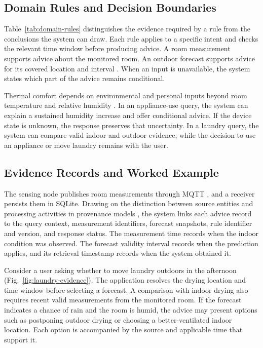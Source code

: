 

\subsection{Domain Rules and Decision Boundaries}
Table~\ref{tab:domain-rules} distinguishes the evidence required by a rule from the conclusions the system can draw. Each rule applies to a specific intent and checks the relevant time window before producing advice. A room measurement supports advice about the monitored room. An outdoor forecast supports advice for its covered location and interval \cite{cwa_open_data}. When an input is unavailable, the system states which part of the advice remains conditional.



Thermal comfort depends on environmental and personal inputs beyond room temperature and relative humidity \cite{tartarini2020cbe}. In an appliance-use query, the system can explain a sustained humidity increase and offer conditional advice. If the device state is unknown, the response preserves that uncertainty. In a laundry query, the system can compare valid indoor and outdoor evidence, while the decision to use an appliance or move laundry remains with the user.

\subsection{Evidence Records and Worked Example}
The sensing node publishes room measurements through MQTT \cite{oasis2019mqtt}, and a receiver persists them in SQLite. Drawing on the distinction between source entities and processing activities in provenance models \cite{w3c2013provo}, the system links each advice record to the query context, measurement identifiers, forecast snapshots, rule identifier and version, and response status. The measurement time records when the indoor condition was observed. The forecast validity interval records when the prediction applies, and its retrieval timestamp records when the system obtained it.

Consider a user asking whether to move laundry outdoors in the afternoon (Fig.~\ref{fig:laundry-evidence}). The application resolves the drying location and time window before selecting a forecast. A comparison with indoor drying also requires recent valid measurements from the monitored room. If the forecast indicates a chance of rain and the room is humid, the advice may present options such as postponing outdoor drying or choosing a better-ventilated indoor location. Each option is accompanied by the source and applicable time that support it.

